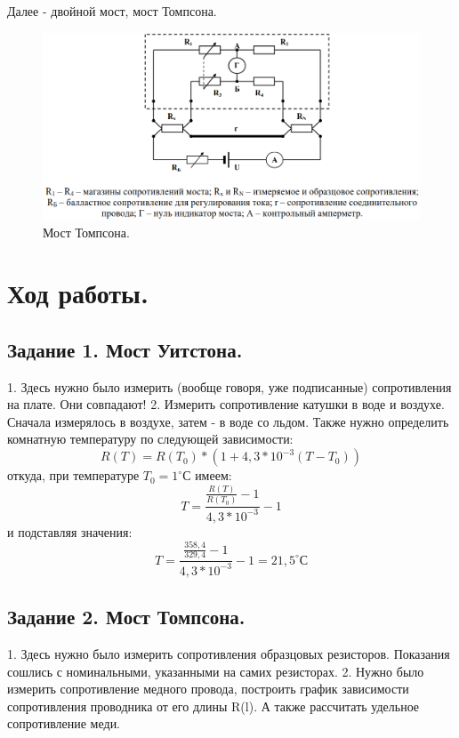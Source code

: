 \documentclass[a4paper,12pt]{article}
\begin{document}
Далее - двойной мост, мост Томпсона.
\begin{figure}[ht!]
	\begin{center}
		\includegraphics[scale=0.6]{scheme_2.png}
	\end{center}
	\caption{Мост Томпсона.}
\end{figure}

\section{Ход работы.}
\subsection{Задание 1. Мост Уитстона.}
1. Здесь нужно было измерить (вообще говоря, уже подписанные) сопротивления на плате. Они совпадают!
2. Измерить сопротивление катушки в воде и воздухе. Сначала измерялось в воздухе, затем - в воде со льдом. Также нужно определить комнатную температуру по следующей зависимости:
\begin{equation}
    R(T) = R(T_0)*(1+4,3*10^{-3}(T-T_0))
\end{equation}
откуда, при температуре $T_0 = 1^{\circ}С$ имеем:
\begin{equation}
    T = \frac{\frac{R(T)}{R(T_0)} - 1}{4,3*10^{-3}} - 1
\end{equation}
и подставляя значения:
\begin{equation}
    T = \frac{\frac{358,4}{329,4} - 1}{4,3*10^{-3}} - 1 = 21,5^{\circ}С
\end{equation}

\clearpage
\subsection{Задание 2. Мост Томпсона.}
1. Здесь нужно было измерить сопротивления образцовых резисторов. Показания сошлись с номинальными, указанными на самих резисторах.
2. Нужно было измерить сопротивление медного провода, построить график зависимости сопротивления проводника от его длины R(l). А также рассчитать удельное сопротивление меди.
\end{document}
